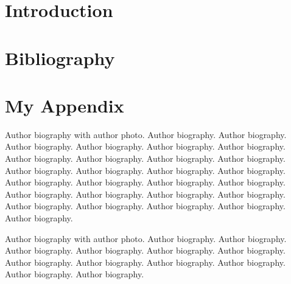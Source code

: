 \documentclass[a4paper,fleqn]{cas-dc}
\begin{document}
\section{Introduction}


%

%

\newcommand{\specialcell}[2][c]{%
\begin{tabular}[#1]{@{}l@{}}#2\end{tabular}}













\section{Bibliography}


\appendix
\section{My Appendix}

\printcredits

%





Author biography with author photo.
Author biography. Author biography. Author biography.
Author biography. Author biography. Author biography.
Author biography. Author biography. Author biography.
Author biography. Author biography. Author biography.
Author biography. Author biography. Author biography.
Author biography. Author biography. Author biography.
Author biography. Author biography. Author biography.
Author biography. Author biography. Author biography.
Author biography. Author biography. Author biography.
\endbio

Author biography with author photo.
Author biography. Author biography. Author biography.
Author biography. Author biography. Author biography.
Author biography. Author biography. Author biography.
Author biography. Author biography. Author biography.
\endbio
\end{document}
